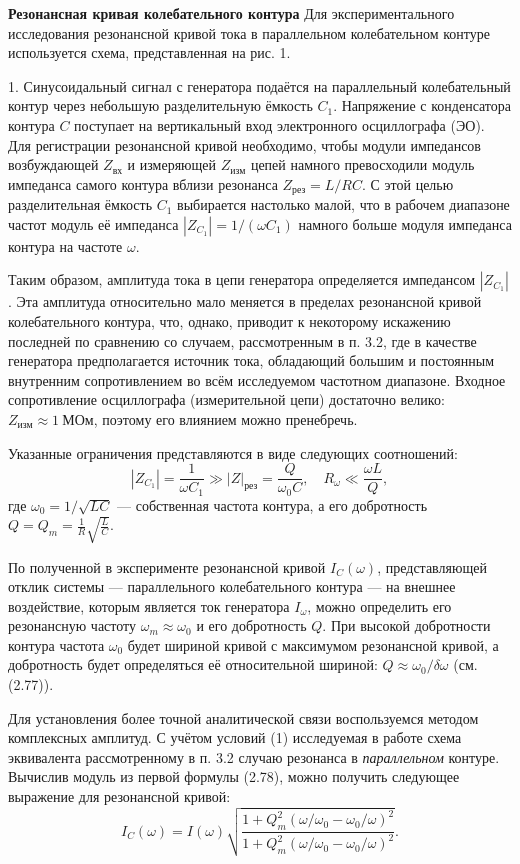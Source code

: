\documentclass[12pt,a4paper]{article}
\begin{document}
\textbf{Резонансная кривая колебательного контура}
Для экспериментального исследования резонансной кривой тока в параллельном колебательном контуре используется схема, представленная на рис. 1. 

1. Синусоидальный сигнал с генератора подаётся на параллельный колебательный контур через небольшую разделительную ёмкость \(C_1\). Напряжение с конденсатора контура \(C\) поступает на вертикальный вход электронного осциллографа (ЭО). Для регистрации резонансной кривой необходимо, чтобы модули импедансов возбуждающей \(Z_{\text{вх}}\) и измеряющей \(Z_{\text{изм}}\) цепей намного превосходили модуль импеданса самого контура вблизи резонанса \(Z_{\text{рез}} = L / RC\). С этой целью разделительная ёмкость \(C_1\) выбирается настолько малой, что в рабочем диапазоне частот модуль её импеданса \(|Z_{C_1}| = 1/(\omega C_1)\) намного больше модуля импеданса контура на частоте \(\omega\).

Таким образом, амплитуда тока в цепи генератора определяется импедансом \(|Z_{C_1}|\). Эта амплитуда относительно мало меняется в пределах резонансной кривой колебательного контура, что, однако, приводит к некоторому искажению последней по сравнению со случаем, рассмотренным в п. 3.2, где в качестве генератора предполагается источник тока, обладающий большим и постоянным внутренним сопротивлением во всём исследуемом частотном диапазоне. Входное сопротивление осциллографа (измерительной цепи) достаточно велико: \(Z_{\text{изм}} \approx 1\ \text{МОм}\), поэтому его влиянием можно пренебречь.

Указанные ограничения представляются в виде следующих соотношений:
\[
|Z_{C_1}| = \frac{1}{\omega C_1} \gg |Z|_{\text{рез}} = \frac{Q}{\omega_0 C}, \quad R_{\omega} \ll \frac{\omega L}{Q},
\]
где \(\omega_0 = 1/\sqrt{LC}\) — собственная частота контура, а его добротность \(Q = Q_m = \frac{1}{R} \sqrt{\frac{L}{C}}\).

По полученной в эксперименте резонансной кривой \(I_C(\omega)\), представляющей отклик системы — параллельного колебательного контура — на внешнее воздействие, которым является ток генератора \(I_{\omega}\), можно определить его резонансную частоту \(\omega_m \approx \omega_0\) и его добротность \(Q\). При высокой добротности контура частота \(\omega_0\) будет шириной кривой с максимумом резонансной кривой, а добротность будет определяться её относительной шириной: \(Q \approx \omega_0 / \delta \omega\) (см. (2.77)).



Для установления более точной аналитической связи воспользуемся
методом комплексных амплитуд. С учётом условий (1) исследуемая в работе схема эквивалента рассмотренному в п. 3.2 случаю резонанса в \textit{параллельном} контуре. Вычислив модуль из первой формулы (2.78), можно получить следующее выражение для резонансной кривой:
\[
I_C(\omega) = I(\omega) \sqrt{\frac{1 + Q_m^2(\omega/\omega_0 - \omega_0/\omega)^2}{1 + Q_m^2(\omega/\omega_0 - \omega_0/\omega)^2}}. \tag{2}
\]
\end{document}

